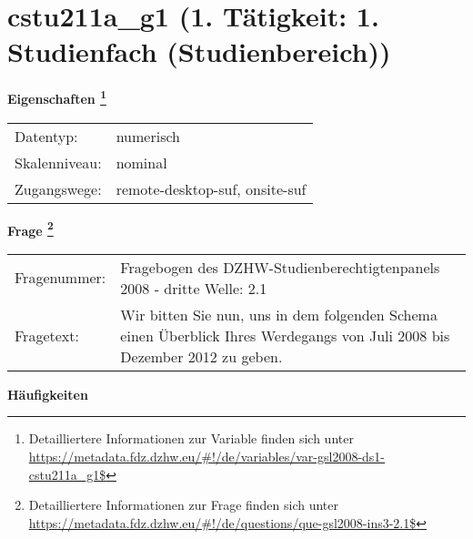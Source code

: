 
    \setcounter{footnote}{0}

    \vspace*{-1.8cm}
	\section{cstu211a\_g1 (1. Tätigkeit: 1. Studienfach (Studienbereich))}
	\label{section:cstu211a_g1}



    \vspace*{0.5cm}
    \noindent\textbf{Eigenschaften
	\footnote{Detailliertere Informationen zur Variable finden sich unter
		\url{https://metadata.fdz.dzhw.eu/\#!/de/variables/var-gsl2008-ds1-cstu211a_g1$}}}\\
	\begin{tabularx}{\hsize}{@{}lX}
	Datentyp: & numerisch \\
	Skalenniveau: & nominal \\
	Zugangswege: &
	  remote-desktop-suf, 
	  onsite-suf
 \\
    \end{tabularx}



				\vspace*{0.5cm}
                \noindent\textbf{Frage
	                \footnote{Detailliertere Informationen zur Frage finden sich unter
		              \url{https://metadata.fdz.dzhw.eu/\#!/de/questions/que-gsl2008-ins3-2.1$}}}\\
				\begin{tabularx}{\hsize}{@{}lX}
					Fragenummer: &
					  Fragebogen des DZHW-Studienberechtigtenpanels 2008 - dritte Welle:
					  2.1
 \\
					Fragetext: & Wir bitten Sie nun, uns in dem folgenden Schema einen Überblick Ihres Werdegangs von Juli 2008 bis Dezember 2012 zu geben. \\
				\end{tabularx}





        		\vspace*{0.5cm}
                \noindent\textbf{Häufigkeiten}

